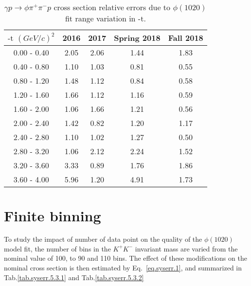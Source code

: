 \begin{table}[!htbp]
    \centering
    \caption{$\gamma p \rightarrow \phi \pi^{+} \pi^{-} p$ cross section relative errors due to $\phi(1020)$ fit range variation in $\mbox{-t}$.}
    \label{tab.syserr.5.2.2}
    \begin{tabular}{|c|c|c|c|c|}
        \hline
        $\mbox{-t}$ $(GeV/c)^{2}$ & 2016 & 2017 & Spring 2018 & Fall 2018 \\
        \hline
        0.00 - 0.40 & 2.05 & 2.06 & 1.44 & 1.83 \\
        0.40 - 0.80 & 1.10 & 1.03 & 0.81 & 0.55 \\ 
        0.80 - 1.20 & 1.48 & 1.12 & 0.84 & 0.58 \\
        1.20 - 1.60 & 1.66 & 1.12 & 1.16 & 0.59 \\
        1.60 - 2.00 & 1.06 & 1.66 & 1.21 & 0.56 \\
        2.00 - 2.40 & 1.42 & 0.82 & 1.20 & 1.17 \\
        2.40 - 2.80 & 1.10 & 1.02 & 1.27 & 0.50 \\
        2.80 - 3.20 & 1.06 & 2.12 & 2.24 & 1.52 \\
        3.20 - 3.60 & 3.33 & 0.89 & 1.76 & 1.86 \\
        3.60 - 4.00 & 5.96 & 1.20 & 4.91 & 1.73 \\ 
        \hline
    \end{tabular}
\end{table}

\section{Finite binning}

To study the impact of number of data point on the quality of the $\phi(1020)$ model fit, the number of bins in the $K^+K^-$ invariant mass are varied from the nominal value of 100, to 90 and 110 bins. The effect of these modifications on the nominal cross section is then estimated by Eq.~\ref{eq.syserr.1}, and summarized in Tab.\ref{tab.syserr.5.3.1} and Tab.\ref{tab.syserr.5.3.2}

